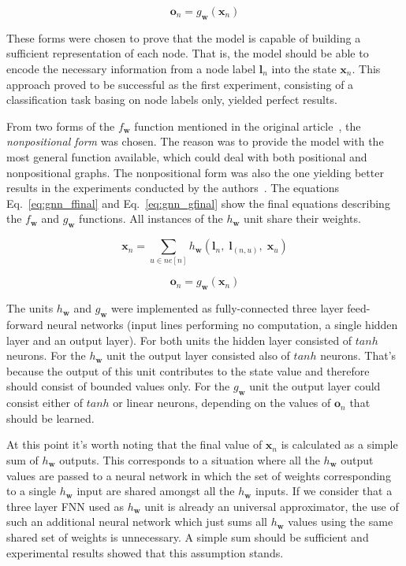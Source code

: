 \begin{equation}
\bm{o}_n = g_{\bm{w}}(\bm{x}_n)
\label{eq:gnn_gmin}
\end{equation}

These forms were chosen to prove that the model is capable of building a sufficient representation of each node. That is, the model should be able to encode the necessary information from a node label $\bm{l}_n$ into the state $\bm{x}_n$. This approach proved to be successful as the first experiment, consisting of a classification task basing on node labels only, yielded perfect results.

From two forms of the $f_{\bm{w}}$ function mentioned in the original article~\cite{scarselli2009graph}, the \emph{nonpositional form} was chosen. The reason was to provide the model with the most general function available, which could deal with both positional and nonpositional graphs. The nonpositional form was also the one yielding better results in the experiments conducted by the authors~\cite{scarselli2009graph}. The equations Eq.~\ref{eq:gnn_ffinal} and Eq.~\ref{eq:gnn_gfinal} show the final equations describing the $f_{\bm{w}}$ and $g_{\bm{w}}$ functions. All instances of the $h_{\bm{w}}$ unit share their weights.

\begin{equation}
\bm{x}_n = \sum_{u \in ne[n]}h_{\bm{w}}(\bm{l}_n, \; \bm{l}_{(n,u)}, \; \bm{x}_{u})
\label{eq:gnn_ffinal}
\end{equation}

\begin{equation}
\bm{o}_n = g_{\bm{w}}(\bm{x}_n)
\label{eq:gnn_gfinal}
\end{equation}

The units $h_{\bm{w}}$ and $g_{\bm{w}}$ were implemented as fully-connected three layer feed-forward neural networks (input lines performing no computation, a single hidden layer and an output layer). For both units the hidden layer consisted of $tanh$ neurons. For the $h_{\bm{w}}$ unit the output layer consisted also of $tanh$ neurons. That's because the output of this unit contributes to the state value and therefore should consist of bounded values only. For the $g_{\bm{w}}$ unit the output layer could consist either of $tanh$ or linear neurons, depending on the values of $\bm{o}_n$ that should be learned.

At this point it's worth noting that the final value of $\bm{x}_n$ is calculated as a simple sum of $h_{\bm{w}}$ outputs. This corresponds to a situation where all the $h_{\bm{w}}$ output values are passed to a neural network in which the set of weights corresponding to a single $h_{\bm{w}}$ input are shared amongst all the $h_{\bm{w}}$ inputs. If we consider that a three layer FNN used as $h_{\bm{w}}$ unit is already an universal approximator, the use of such an additional neural network which just sums all $h_{\bm{w}}$ values using the same shared set of weights is unnecessary. A simple sum should be sufficient and experimental results showed that this assumption stands.

